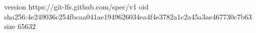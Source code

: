 version https://git-lfs.github.com/spec/v1
oid sha256:4e249036c254fbcaa041ae1949626034ea4f4e3782a1c2a45a3ae467730c7b63
size 65632

